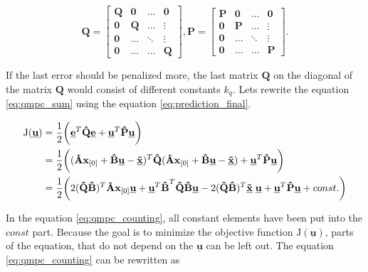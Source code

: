 \documentclass{article}
\begin{document}
\begin{equation}
\label{eq:qmpc_weighting_matrices}
\textbf{\^Q} = \begin{bmatrix}
\textbf{Q} & \textbf{0} & \hdots & \textbf{0} \\
\textbf{0} & \textbf{Q} & \hdots & \vdots \\
\textbf{0} & \hdots & \ddots & \vdots \\
\textbf{0} & \hdots & \hdots & \textbf{Q}
\end{bmatrix},
\textbf{\^P} = \begin{bmatrix}
\textbf{P} & \textbf{0} & \hdots & \textbf{0} \\
\textbf{0} & \textbf{P} & \hdots & \vdots \\
\textbf{0} & \hdots & \ddots & \vdots \\
\textbf{0} & \hdots & \hdots & \textbf{P}
\end{bmatrix}.
\end{equation}

If the last error should be penalized more, the last matrix $\textbf{Q}$ on the diagonal of the matrix $\textbf{\^Q}$ would consist of different constants $k_q$. Lets rewrite the equation \ref{eq:qmpc_sum} using the equation \ref{eq:prediction_final}.

\begin{equation}
\begin{split}
\label{eq:qmpc_counting}
\mathrm{J}(\underline{\textbf{u}}) 
&= \frac{1}{2}\bigg(\underline{\textbf{e}}^T 
\textbf{\^Q} \underline{\textbf{e}}+\underline{\textbf{u}}^T 
\textbf{\^P} \underline{\textbf{u}}\bigg)\\
&=\frac{1}{2}\bigg((\textbf{\^A}\textbf{x}_{[0]} + \textbf{\^B}	  \textbf{\underline{u}}-\underline{\textbf{\~x}})^T 
\textbf{\^Q}
(\textbf{\^A}\textbf{x}_{[0]} + \textbf{\^B}\textbf{\underline{u}}-\underline{\textbf{\~x}}) 
+\underline{\textbf{u}}^T 
\textbf{\^P} \underline{\textbf{u}}\bigg)\\
&=\frac{1}{2}\bigg(
2(\textbf{\^Q}\textbf{\^B})^T \textbf{\^A} \textbf{x}_{[0]} \underline{\textbf{u}}
+\textbf{\underline{u}}^T \textbf{\^B}^T\textbf{\^Q} \textbf{\^B}\textbf{\underline{u}}
-2(\textbf{\^Q}\textbf{\^B})^T \underline{\textbf{\~x}}\; \underline{\textbf{u}}
+\underline{\textbf{u}}^T 
\textbf{\^P} \underline{\textbf{u}}+const.\bigg)
\end{split}
\end{equation}

In the equation \ref{eq:qmpc_counting}, all constant elements have been put into the $const$ part. Because the goal is to minimize the objective function $\mathrm{J}(\underline{\textbf{u}})$, parts of the equation, that do not depend on the $\underline{\textbf{u}}$ can be left out. The equation \ref{eq:qmpc_counting} can be rewritten as
\end{document}
